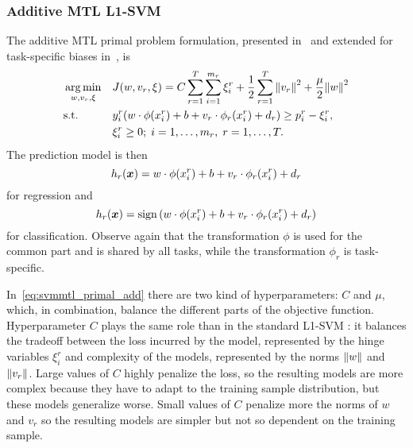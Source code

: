 \subsubsection{{Additive} MTL L1-SVM}
The {additive} MTL primal problem formulation, presented in~\cite{EvgeniouP04} 
and extended for task-specific biases in~\cite{CaiC12}, is
\begin{equation}\label{eq:svmmtl_primal_add}
    \begin{aligned}
    & \argmin_{w, {v}_r, \xi}
    & & {J({w}, {v}_r, \xi) = C \sum_{r= 1}^T \sum_{i=1}^{m_r} {\xi_{i}^r} + \frac{1}{2} \sum_{r= 1}^T{\norm{{v}_r}^2} + \frac{\mu}{2} {\norm{{w}}}^2} \\
    & \text{s.t.}
    & & y_{i}^r ({w} \cdot \phi(x_{i}^r) + b  + {v}_r \cdot \phi_r(x_{i}^r) + d_r) \geq p_{i}^r - \xi_{i}^r ,  \\
    & & & \xi_{i}^r \geq 0; \;  i=1 , \dotsc , m_r, \;  r= 1,\dotsc, T  . \\
    \end{aligned}
\end{equation}
The prediction model is then 
\begin{equation}
    \nonumber
    h_r(\bm{x}) = {w} \cdot \phi(x_{i}^r) + b  + {v}_r \cdot \phi_r(x_{i}^r) + d_r
\end{equation}
for regression and 
\begin{equation}
    \nonumber
    h_r(\bm{x}) = \operatorname{sign}{ \left({w} \cdot \phi(x_{i}^r) + b  + {v}_r \cdot \phi_r(x_{i}^r) + d_r \right)}
\end{equation}
for classification.
Observe again that the transformation $\phi$ is used for the common part and is shared by all tasks, while the transformation $\phi_r$ is task-specific.

%
In~\eqref{eq:svmmtl_primal_add} there are two kind of hyperparameters: $C$ and $\mu$, which, in combination, balance the different parts of the objective function. 
%
Hyperparameter $C$ plays the same role than in the standard L1-SVM : it balances the tradeoff between the loss incurred by the model, represented by the hinge variables $\xi_i^r$ and complexity of the models, represented by the norms $\left\lVert{w}\right\rVert$ and $\left\lVert{v}_r\right\rVert$. Large values of $C$ highly penalize the loss, so the resulting models are more complex because they have to adapt to the training sample distribution, but these models generalize worse. Small values of $C$ penalize more the norms of $w$ and $v_r$ so the resulting models are simpler but not so dependent on the training sample.

